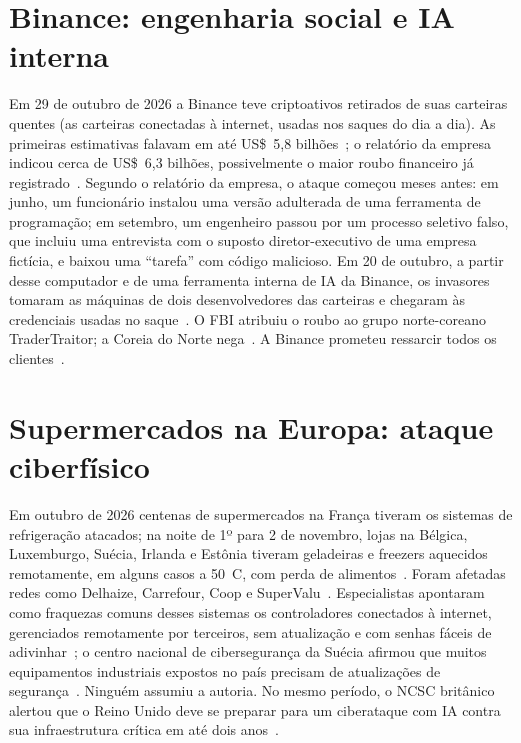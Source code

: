 \documentclass[12pt,openright,oneside,a4paper,english,brazil]{abntex2}
\begin{document}
\section{Binance: engenharia social e IA interna}

Em 29 de outubro de 2026 a Binance teve criptoativos retirados de suas carteiras quentes (as carteiras conectadas à internet, usadas nos saques do dia a dia). As primeiras estimativas falavam em até US\$~5,8 bilhões~\cite{bleeping-binance}; o relatório da empresa indicou cerca de US\$~6,3 bilhões, possivelmente o maior roubo financeiro já registrado~\cite{reuters-binance}. Segundo o relatório da empresa, o ataque começou meses antes: em junho, um funcionário instalou uma versão adulterada de uma ferramenta de programação; em setembro, um engenheiro passou por um processo seletivo falso, que incluiu uma entrevista com o suposto diretor-executivo de uma empresa fictícia, e baixou uma \enquote{tarefa} com código malicioso. Em 20 de outubro, a partir desse computador e de uma ferramenta interna de IA da Binance, os invasores tomaram as máquinas de dois desenvolvedores das carteiras e chegaram às credenciais usadas no saque~\cite{reuters-binance,startse-binance}. O FBI atribuiu o roubo ao grupo norte-coreano TraderTraitor; a Coreia do Norte nega~\cite{startse-binance}. A Binance prometeu ressarcir todos os clientes~\cite{reuters-binance}.

\section{Supermercados na Europa: ataque ciberfísico}

Em outubro de 2026 centenas de supermercados na França tiveram os sistemas de refrigeração atacados; na noite de 1º para 2 de novembro, lojas na Bélgica, Luxemburgo, Suécia, Irlanda e Estônia tiveram geladeiras e freezers aquecidos remotamente, em alguns casos a 50~\textdegree C, com perda de alimentos~\cite{aljazeera-geladeiras,cbs-geladeiras,tecnoblog-geladeiras}. Foram afetadas redes como Delhaize, Carrefour, Coop e SuperValu~\cite{aljazeera-quem}. Especialistas apontaram como fraquezas comuns desses sistemas os controladores conectados à internet, gerenciados remotamente por terceiros, sem atualização e com senhas fáceis de adivinhar~\cite{aljazeera-quem}; o centro nacional de cibersegurança da Suécia afirmou que muitos equipamentos industriais expostos no país precisam de atualizações de segurança~\cite{tecnoblog-geladeiras}. Ninguém assumiu a autoria. No mesmo período, o NCSC britânico alertou que o Reino Unido deve se preparar para um ciberataque com IA contra sua infraestrutura crítica em até dois anos~\cite{aljazeera-quem}.
\end{document}
